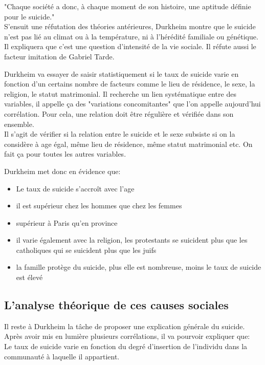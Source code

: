\documentclass[10pt, a4paper, openany]{book}
\begin{document}
"Chaque société a donc, à chaque moment de son histoire, une aptitude définie pour le suicide." \\
S'ensuit une réfutation des théories antérieures, Durkheim montre que le suicide n'est pas lié au climat ou à la température, ni à l'hérédité familiale ou génétique. Il expliquera que c'est une question d'intensité de la vie sociale. Il réfute aussi le facteur imitation de Gabriel Tarde.


Durkheim va essayer de saisir statistiquement si le taux de suicide varie en fonction d'un certains nombre de facteurs comme le lieu de résidence, le sexe, la religion, le statut matrimonial. Il recherche un lien systématique entre des variables, il appelle ça des "variations concomitantes" que l'on appelle aujourd'hui corrélation. Pour cela, une relation doit être régulière et vérifiée dans son ensemble. \\
Il s'agit de vérifier si la relation entre le suicide et le sexe subsiste si on la considère à age égal, même lieu de résidence, même statut matrimonial etc. On fait ça pour toutes les autres variables.


Durkheim met donc en évidence que:
\begin{itemize}
\item Le taux de suicide s'accroît avec l'age
\item il est supérieur chez les hommes que chez les femmes
\item supérieur à Paris qu'en province
\item il varie également avec la religion, les protestants se suicident plus que les catholiques qui se suicident plus que les juifs
\item la famille protège du suicide, plus elle est nombreuse, moins le taux de suicide est élevé
\end{itemize}


\subsection{L'analyse théorique de ces causes sociales}

Il reste à Durkheim la tâche de proposer une explication générale du suicide. Après avoir mis en lumière plusieurs corrélations, il va pourvoir expliquer que: \\
Le taux de suicide varie en fonction du degré d'insertion de l'individu dans la communauté à laquelle il appartient.
\end{document}
